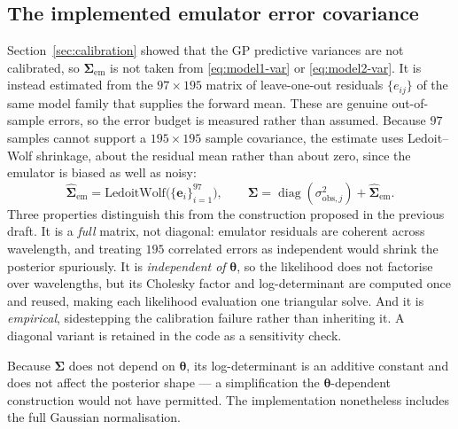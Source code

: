 \documentclass[12pt, letterpaper, oneside]{article}
\begin{document}
\subsection{The implemented emulator error covariance}
\label{subsec:implemented-likelihood}

Section~\ref{sec:calibration} showed that the GP predictive variances are not
calibrated, so $\bm\Sigma_{\mathrm{em}}$ is not taken from
\eqref{eq:model1-var} or \eqref{eq:model2-var}. It is instead estimated from
the $97\times195$ matrix of leave-one-out residuals $\{e_{ij}\}$ of the same
model family that supplies the forward mean. These are genuine out-of-sample
errors, so the error budget is measured rather than assumed. Because $97$
samples cannot support a $195\times195$ sample covariance, the estimate uses
Ledoit--Wolf shrinkage, about the residual mean rather than about zero, since
the emulator is biased as well as noisy:
\begin{equation}
    \widehat{\bm\Sigma}_{\mathrm{em}}
    =\mathrm{LedoitWolf}\bigl(\{ \mathbf e_i \}_{i=1}^{97}\bigr),
    \qquad
    \bm\Sigma=\operatorname{diag}(\sigma^2_{\mathrm{obs},j})
    +\widehat{\bm\Sigma}_{\mathrm{em}}.
    \label{eq:sigma-em}
\end{equation}
Three properties distinguish this from the construction proposed in the
previous draft. It is a \emph{full} matrix, not diagonal: emulator residuals
are coherent across wavelength, and treating $195$ correlated errors as
independent would shrink the posterior spuriously. It is \emph{independent of}
$\bm\theta$, so the likelihood does not factorise over wavelengths, but its
Cholesky factor and log-determinant are computed once and reused, making each
likelihood evaluation one triangular solve. And it is \emph{empirical},
sidestepping the calibration failure rather than inheriting it. A diagonal
variant is retained in the code as a sensitivity check.

Because $\bm\Sigma$ does not depend on $\bm\theta$, its log-determinant is an
additive constant and does not affect the posterior shape --- a simplification
the $\bm\theta$-dependent construction would not have permitted. The
implementation nonetheless includes the full Gaussian normalisation.
\end{document}
